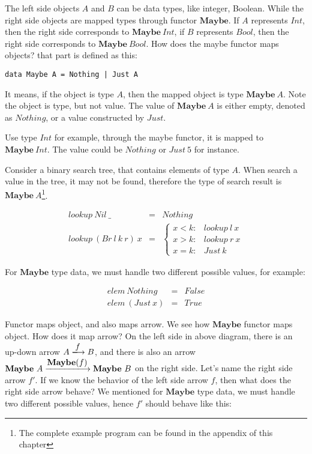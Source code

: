 \documentclass{article}
\begin{document}
\begin{example}
The left side objects $A$ and $B$ can be data types, like integer, Boolean. While the right side objects are mapped types through functor $\mathbf{Maybe}$. If $A$ represents $Int$, then the right side corresponds to $\mathbf{Maybe}\ Int$, if $B$ represents $Bool$, then the right side corresponds to $\mathbf{Maybe}\ Bool$. How does the maybe functor maps objects? that part is defined as this:

\lstset{frame=none}
\begin{lstlisting}
data Maybe A = Nothing | Just A
\end{lstlisting}

It means, if the object is type $A$, then the mapped object is type $\mathbf{Maybe}\ A$. Note the object is type, but not value. The value of $\mathbf{Maybe}\ A$ is either empty, denoted as $Nothing$, or a value constructed by $Just$.

Use type $Int$ for example, through the maybe functor, it is mapped to $\mathbf{Maybe}\ Int$. The value could be $Nothing$ or $Just\ 5$ for instance.

Consider a binary search tree, that contains elements of type $A$. When search a value in the tree, it may not be found, therefore the type of search result is $\mathbf{Maybe}\ A$\footnote{The complete example program can be found in the appendix of this chapter}.

\[
\begin{array}{rcl}
lookup\ Nil\ \_ & = & Nothing \\
lookup\ (Br\ l\ k\ r)\ x & = & \begin{cases}
  x < k: & lookup\ l\ x \\
  x > k: & lookup\ r\ x \\
  x = k: & Just\ k
\end{cases}
\end{array}
\]

For $\mathbf{Maybe}$ type data, we must handle two different possible values, for example:

\[
\begin{array}{lcl}
elem\ Nothing & = & False \\
elem\ (Just\ x) & = & True
\end{array}
\]

Functor maps object, and also maps arrow. We see how $\mathbf{Maybe}$ functor maps object. How does it map arrow? On the left side in above diagram, there is an up-down arrow $A \arrowto{f} B$, and there is also an arrow $\mathbf{Maybe}\ A \arrowto{\mathbf{Maybe}(f)} \mathbf{Maybe}\ B$ on the right side. Let's name the right side arrow $f'$. If we know the behavior of the left side arrow $f$, then what does the right side arrow behave? We mentioned for $\mathbf{Maybe}$ type data, we must handle two different possible values, hence $f'$ should behave like this:


\end{example}
\end{document}

